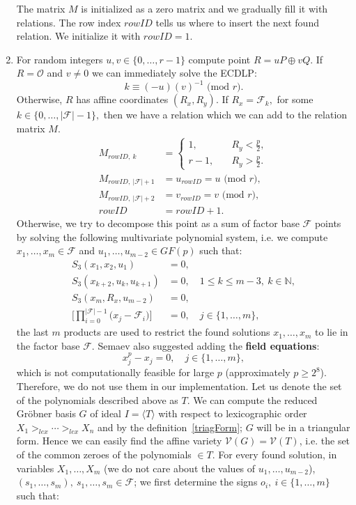 \documentclass[thesis=M,english]{FITthesis}[2012/10/20]
\theoremstyle{remark}
\theoremstyle{definition}
\begin{document}
\begin{enumerate}
The matrix $M$ is initialized as a zero matrix and we gradually fill it with relations. The row index $rowID$ tells us where to insert the next found relation. We initialize it with $rowID = 1$.
\item For random integers $u,v \in \{0, \ldots, r-1\}$ compute point ${R = uP \oplus vQ.}$ If $R = \mathcal{O}$ and $v \neq 0$ we can immediately solve the ECDLP:
$$k \equiv  (-u)(v)^{-1} \text{ (mod $r$)}.$$ Otherwise, $R$ has affine coordinates $(R_x, R_y)$. If $R_x = \mathcal{F}_k,$ for some $k \in \{0,\ldots,|\mathcal{F}| - 1\},$ then we have a relation which we can add to the relation matrix $M$.
\begin{align*}
M_{rowID,\ k} &=\begin{cases} 1, \quad &R_y < \frac{p}{2}, \\
r-1, \quad &R_y > \frac{p}{2}.
\end{cases}\\
M_{rowID,\ |\mathcal{F}| + 1} &= u_{rowID} = u \text{ (mod $r$)}, \\
M_{rowID,\ |\mathcal{F}| + 2} &= v_{rowID} = v \text{ (mod $r$)}, \\
rowID &= rowID + 1.
\end{align*}
Otherwise, we try to decompose this point as a sum of factor base $\mathcal{F}$ points by solving the following multivariate polynomial system, i.e. we compute $x_1,\ldots,x_m \in \mathcal{F}$ and $u_1,\ldots,u_{m-2} \in GF(p)$ such that:
\begin{align*}
S_3(x_1,x_2,u_1) &= 0, \\
S_3(x_{k+2},u_k,u_{k+1}) &= 0,\quad 1 \leq k \leq m - 3,\ k \in \mathbb{N}, \\
S_3(x_m,R_x,u_{m-2}) &= 0, \\
\Bigg[\prod_{i=0}^{|\mathcal{F}| -1}\Big(x_j - \mathcal{F}_i\Big)\Bigg] &= 0, \quad  j \in \{1, \ldots, m\},
\end{align*}
the last $m$ products are used to restrict the found solutions $x_1,\ldots,x_m$ to lie in the factor base $\mathcal{F}$. Semaev also suggested adding the \textbf{field equations}:
$$
x_j^p - x_j = 0, \quad j \in \{1, \ldots, m\},
$$
which is not computationally feasible for large $p$ (approximately $p \geq 2^{8}$). Therefore, we do not use them in our implementation. Let us denote the set of the polynomials described above as $T$. We can compute the reduced Gröbner basis $G$ of ideal $I = \langle T \rangle$  with respect to lexicographic order $X_1 >_{lex} \cdots >_{lex} X_n$ and by the definition~\ref{triagForm}; $G$ will be in a triangular form. Hence we can easily find the affine variety $\mathcal{V}(G) = \mathcal{V}(T)$, i.e. the set of the common zeroes of the polynomials $\in T$. For every found solution, in variables $X_1,\ldots,X_m$ (we do not care about the values of $u_1,\ldots,u_{m-2}$), ${(s_1, \ldots, s_m),\ s_1,\ldots,s_m \in \mathcal{F}}$; we first determine the signs $o_i,\ i \in \{1,\ldots,m\}$ such that:

\end{enumerate}
\end{document}
